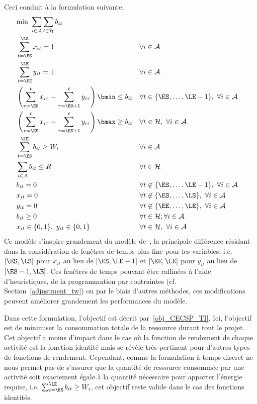 Ceci conduit à la formulation suivante:
{\small
 \begin{align} &\text{min }
\sum_{i\in \A}\sum_{t \in \H} b_{it}
\label{obj_CECSP_TI}\\ &\sum_{t=\ES}^{\LS} x_{it} = 1 & &\forall i
\in \A \label{start_CECSP_TI}\\ &\sum_{t=\EE}^{\LE} y_{it} =
1 & & \forall i \in \A
\label{end_CECSP_TI}\\&\left(\sum_{\tau=\ES}^{t} x_{i\tau}
-\sum_{\tau=\ES+1}^{t} y_{i\tau}\right)\bmin \le b_{it} & &
\forall t \in \{\ES,\dots,\LE-1\},\ \forall i \in \A
\label{bmin_CECSP_TI}\\ &\left(\sum_{\tau=\ES}^{t} x_{i\tau} -
\sum_{\tau=\ES+1}^{t} y_{i\tau}\right)\bmax\ge b_{it}& & \forall t
\in \H ,\ \forall i \in \A \label{bmax_CECSP_TI}\\
&\sum_{t=\ES}^{\LE} b_{it} \ge W_i & & \forall i \in \A
\label{nrj_CECSP_TI}\\ &\sum_{i \in \A} b_{it} \le R & &
\forall t \in \H \label{res_CECSP_TI}\\ &b_{it} = 0 & &
\forall t \not\in \{\ES,\dots,\LE-1\},\ \forall i \in \A
\label{consNul_CECSP_TI}\\ &x_{it} = 0 & & \forall t \not\in
\{\ES,\dots,\LS\},\ \forall i \in \A \label{twx_CECSP_TI}\\
&y_{it} = 0 & & \forall t \not\in \{\EE,\dots,\LE\},\ \forall i
\in \A \label{twy_CECSP_TI}\\ & b_{it} \ge 0 & & \forall t
\in \H; \forall i \in \A \label{Bb_CECSP_TI}\\
&x_{it}\in \{0,1\},\ y_{it} \in \{0,1\} & & \forall t \in {\cal
H},\ \forall i \in \A \label{Bxy_CECSP_TI} \end{align}
}
Ce modèle s'inspire grandement du modèle
de~\cite{ALR}, la principale différence résidant
dans la considération de fenêtres de temps plus fine pour les
variables, i.e. $[\ES,\LS]$ pour $x_{it}$ au lieu de
$[\ES,\LE-1]$ et $[\EE,\LE]$ pour $y_{it}$ au lieu de
$[\ES-1,\LE]$. Ces fenêtres de temps pouvant être raffinées à
l'aide d'heuristiques, de la programmation par contraintes (cf.
Section~\ref{adjustment_tw}) ou par le biais d'autres méthodes,
ces modifications peuvent améliorer grandement les performances du
modèle.

Dans cette formulation, l'objectif est décrit
par~\eqref{obj_CECSP_TI}. Ici, l'objectif est de minimiser la
consommation totale de la ressource durant tout le projet. Cet
objectif a moins d'impact dans le cas où la fonction de rendement
de chaque activité est la fonction identité mais se révèle très
pertinent pour d'autres types de fonctions de rendement.
Cependant, comme la formulation à temps discret ne nous permet pas
de s'assurer que la quantité de ressource consommée par une
activité soit exactement égale à la quantité nécessaire pour
apporter l'énergie requise, i.e. $\sum_{t=\ES}^{\LE} b_{it} \ge
W_i$, cet objectif reste valide dans le cas des fonctions
identités.

